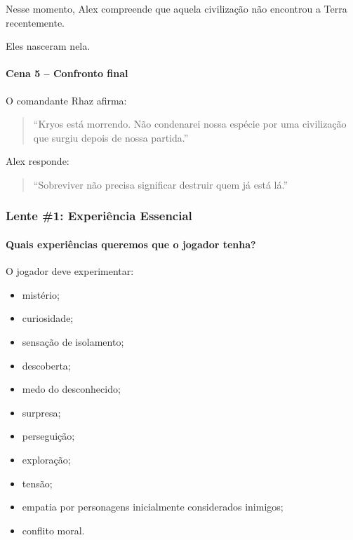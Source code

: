\documentclass[12pt,a4paper]{article}
\begin{document}
Nesse momento, Alex compreende que aquela civilização não encontrou a
Terra recentemente.

Eles nasceram nela.

\paragraph{Cena 5 -- Confronto final}

O comandante Rhaz afirma:

\begin{quote}
``Kryos está morrendo. Não condenarei nossa espécie por uma civilização
que surgiu depois de nossa partida.''
\end{quote}

Alex responde:

\begin{quote}
``Sobreviver não precisa significar destruir quem já está lá.''
\end{quote}


\subsubsection*{Lente \#1: Experiência Essencial}

\paragraph{Quais experiências queremos que o jogador tenha?}

O jogador deve experimentar:

\begin{itemize}
    \item mistério;
    \item curiosidade;
    \item sensação de isolamento;
    \item descoberta;
    \item medo do desconhecido;
    \item surpresa;
    \item perseguição;
    \item exploração;
    \item tensão;
    \item empatia por personagens inicialmente considerados inimigos;
    \item conflito moral.
\end{itemize}
\end{document}

